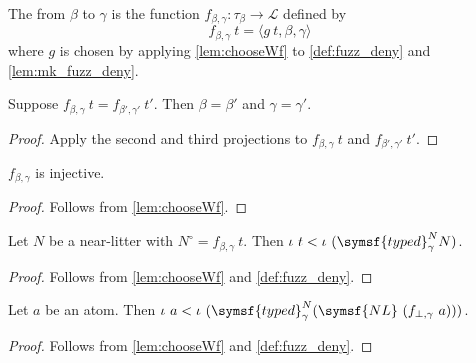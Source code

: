 \begin{definition}
    The  from \( \beta \) to \( \gamma \) is the function \( f_{\beta,\gamma} : \tau_\beta \to \mathcal L \) defined by
    \[ f_{\beta,\gamma}\ t = \langle g\ t, \beta, \gamma \rangle \]
    where \( g \) is chosen by applying \cref{lem:chooseWf} to \cref{def:fuzz_deny} and \cref{lem:mk_fuzz_deny}.
\end{definition}
\begin{lemma}
    \label{lem:fuzz_congr}
    Suppose \( f_{\beta,\gamma}\ t = f_{\beta',\gamma'}\ t' \).
    Then \( \beta = \beta' \) and \( \gamma = \gamma' \).
\end{lemma}
\begin{proof}
    Apply the second and third projections to \( f_{\beta,\gamma}\ t \) and \( f_{\beta',\gamma'}\ t' \).
\end{proof}
\begin{lemma}
    \( f_{\beta,\gamma} \) is injective.
\end{lemma}
\begin{proof}
    Follows from \cref{lem:chooseWf}.
\end{proof}
\begin{lemma}
    \label{lem:fuzz_pos}
    Let \( N \) be a near-litter with \( N^\circ = f_{\beta,\gamma}\ t \).
    Then \( \iota\ t < \iota\ (\symsf{typed}^N_\gamma N) \).
\end{lemma}
\begin{proof}
    Follows from \cref{lem:chooseWf} and \cref{def:fuzz_deny}.
\end{proof}
\begin{lemma}
    \label{lem:pos_atom_lt_fuzz}
    Let \( a \) be an atom.
    Then \( \iota\ a < \iota\ (\symsf{typed}^N_\gamma (\symsf{NL}\ (f_{\bot,\gamma}\ a))) \).
\end{lemma}
\begin{proof}
    Follows from \cref{lem:chooseWf} and \cref{def:fuzz_deny}.
\end{proof}
